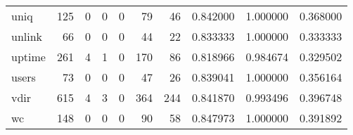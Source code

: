 \begin{longtable}{lrrrrrrrrr}
uniq      &                                   125 &                                                  0 &                                                  0 &                                                  0 &                                                 79 &                                                 46 &                                           0.842000 &                               1.000000 &                             0.368000 \\
unlink    &                                    66 &                                                  0 &                                                  0 &                                                  0 &                                                 44 &                                                 22 &                                           0.833333 &                               1.000000 &                             0.333333 \\
uptime    &                                   261 &                                                  4 &                                                  1 &                                                  0 &                                                170 &                                                 86 &                                           0.818966 &                               0.984674 &                             0.329502 \\
users     &                                    73 &                                                  0 &                                                  0 &                                                  0 &                                                 47 &                                                 26 &                                           0.839041 &                               1.000000 &                             0.356164 \\
vdir      &                                   615 &                                                  4 &                                                  3 &                                                  0 &                                                364 &                                                244 &                                           0.841870 &                               0.993496 &                             0.396748 \\
wc        &                                   148 &                                                  0 &                                                  0 &                                                  0 &                                                 90 &                                                 58 &                                           0.847973 &                               1.000000 &                             0.391892 \\

\end{longtable}

